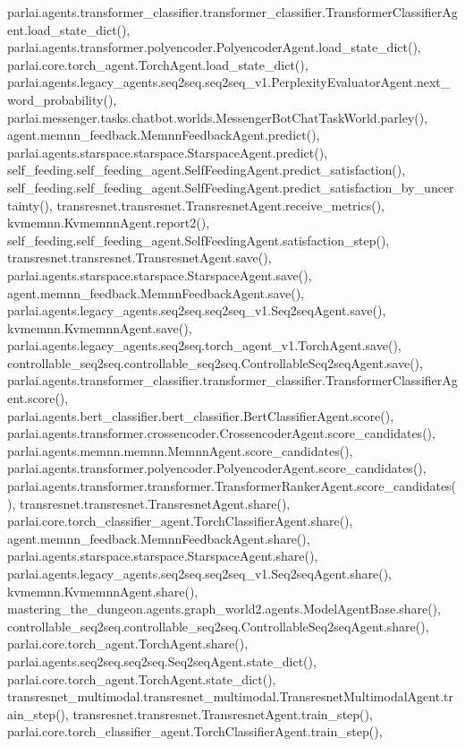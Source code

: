 parlai.\+agents.\+transformer\+\_\+classifier.\+transformer\+\_\+classifier.\+Transformer\+Classifier\+Agent.\+load\+\_\+state\+\_\+dict(), parlai.\+agents.\+transformer.\+polyencoder.\+Polyencoder\+Agent.\+load\+\_\+state\+\_\+dict(), parlai.\+core.\+torch\+\_\+agent.\+Torch\+Agent.\+load\+\_\+state\+\_\+dict(), parlai.\+agents.\+legacy\+\_\+agents.\+seq2seq.\+seq2seq\+\_\+v1.\+Perplexity\+Evaluator\+Agent.\+next\+\_\+word\+\_\+probability(), parlai.\+messenger.\+tasks.\+chatbot.\+worlds.\+Messenger\+Bot\+Chat\+Task\+World.\+parley(), agent.\+memnn\+\_\+feedback.\+Memnn\+Feedback\+Agent.\+predict(), parlai.\+agents.\+starspace.\+starspace.\+Starspace\+Agent.\+predict(), self\+\_\+feeding.\+self\+\_\+feeding\+\_\+agent.\+Self\+Feeding\+Agent.\+predict\+\_\+satisfaction(), self\+\_\+feeding.\+self\+\_\+feeding\+\_\+agent.\+Self\+Feeding\+Agent.\+predict\+\_\+satisfaction\+\_\+by\+\_\+uncertainty(), transresnet.\+transresnet.\+Transresnet\+Agent.\+receive\+\_\+metrics(), kvmemnn.\+Kvmemnn\+Agent.\+report2(), self\+\_\+feeding.\+self\+\_\+feeding\+\_\+agent.\+Self\+Feeding\+Agent.\+satisfaction\+\_\+step(), transresnet.\+transresnet.\+Transresnet\+Agent.\+save(), parlai.\+agents.\+starspace.\+starspace.\+Starspace\+Agent.\+save(), agent.\+memnn\+\_\+feedback.\+Memnn\+Feedback\+Agent.\+save(), parlai.\+agents.\+legacy\+\_\+agents.\+seq2seq.\+seq2seq\+\_\+v1.\+Seq2seq\+Agent.\+save(), kvmemnn.\+Kvmemnn\+Agent.\+save(), parlai.\+agents.\+legacy\+\_\+agents.\+seq2seq.\+torch\+\_\+agent\+\_\+v1.\+Torch\+Agent.\+save(), controllable\+\_\+seq2seq.\+controllable\+\_\+seq2seq.\+Controllable\+Seq2seq\+Agent.\+save(), parlai.\+agents.\+transformer\+\_\+classifier.\+transformer\+\_\+classifier.\+Transformer\+Classifier\+Agent.\+score(), parlai.\+agents.\+bert\+\_\+classifier.\+bert\+\_\+classifier.\+Bert\+Classifier\+Agent.\+score(), parlai.\+agents.\+transformer.\+crossencoder.\+Crossencoder\+Agent.\+score\+\_\+candidates(), parlai.\+agents.\+memnn.\+memnn.\+Memnn\+Agent.\+score\+\_\+candidates(), parlai.\+agents.\+transformer.\+polyencoder.\+Polyencoder\+Agent.\+score\+\_\+candidates(), parlai.\+agents.\+transformer.\+transformer.\+Transformer\+Ranker\+Agent.\+score\+\_\+candidates(), transresnet.\+transresnet.\+Transresnet\+Agent.\+share(), parlai.\+core.\+torch\+\_\+classifier\+\_\+agent.\+Torch\+Classifier\+Agent.\+share(), agent.\+memnn\+\_\+feedback.\+Memnn\+Feedback\+Agent.\+share(), parlai.\+agents.\+starspace.\+starspace.\+Starspace\+Agent.\+share(), parlai.\+agents.\+legacy\+\_\+agents.\+seq2seq.\+seq2seq\+\_\+v1.\+Seq2seq\+Agent.\+share(), kvmemnn.\+Kvmemnn\+Agent.\+share(), mastering\+\_\+the\+\_\+dungeon.\+agents.\+graph\+\_\+world2.\+agents.\+Model\+Agent\+Base.\+share(), controllable\+\_\+seq2seq.\+controllable\+\_\+seq2seq.\+Controllable\+Seq2seq\+Agent.\+share(), parlai.\+core.\+torch\+\_\+agent.\+Torch\+Agent.\+share(), parlai.\+agents.\+seq2seq.\+seq2seq.\+Seq2seq\+Agent.\+state\+\_\+dict(), parlai.\+core.\+torch\+\_\+agent.\+Torch\+Agent.\+state\+\_\+dict(), transresnet\+\_\+multimodal.\+transresnet\+\_\+multimodal.\+Transresnet\+Multimodal\+Agent.\+train\+\_\+step(), transresnet.\+transresnet.\+Transresnet\+Agent.\+train\+\_\+step(), parlai.\+core.\+torch\+\_\+classifier\+\_\+agent.\+Torch\+Classifier\+Agent.\+train\+\_\+step(), 